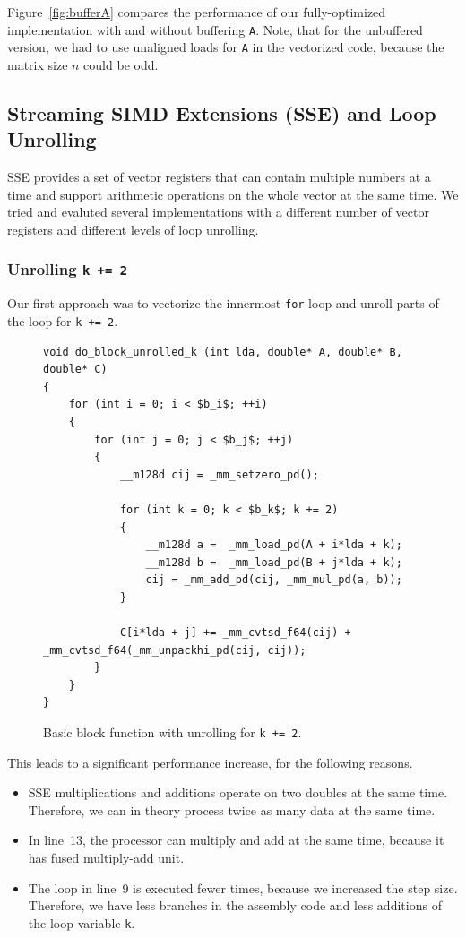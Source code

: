\documentclass[12pt]{article}
\begin{document}
Figure~\ref{fig:bufferA} compares the performance of our fully-optimized implementation with and without buffering \lstinline{A}. Note, that for the unbuffered version, we had to use unaligned loads for \lstinline{A} in the vectorized code, because the matrix size $n$ could be odd.

\subsection{Streaming SIMD Extensions (SSE) and Loop Unrolling}
SSE provides a set of vector registers that can contain multiple numbers at a time and support arithmetic operations on the whole vector at the same time. We tried and evaluted several implementations with a different number of vector registers and different levels of loop unrolling.

\subsubsection{Unrolling \lstinline{k += 2}}
Our first approach was to vectorize the innermost \lstinline{for} loop and unroll parts of the loop for \lstinline{k += 2}.

\begin{figure}[H]
\begin{lstlisting}[mathescape]
void do_block_unrolled_k (int lda, double* A, double* B, double* C)
{
	for (int i = 0; i < $b_i$; ++i)
	{
		for (int j = 0; j < $b_j$; ++j)
		{
			__m128d cij = _mm_setzero_pd();

			for (int k = 0; k < $b_k$; k += 2)
			{
				__m128d a =  _mm_load_pd(A + i*lda + k);
				__m128d b =  _mm_load_pd(B + j*lda + k);
				cij = _mm_add_pd(cij, _mm_mul_pd(a, b)); 
			}

			C[i*lda + j] += _mm_cvtsd_f64(cij) + _mm_cvtsd_f64(_mm_unpackhi_pd(cij, cij));
		}
	}
}
\end{lstlisting}
\caption{Basic block function with unrolling for \lstinline{k += 2}.}
\label{fig:basic_sse}
\end{figure}

This leads to a significant performance increase, for the following reasons.
\begin{itemize}
	\item SSE multiplications and additions operate on two doubles at the same time. Therefore, we can in theory process twice as many data at the same time.
	\item In line~13, the processor can multiply and add at the same time, because it has fused multiply-add unit.
	\item The loop in line~9 is executed fewer times, because we increased the step size. Therefore, we have less branches in the assembly code and less additions of the loop variable \lstinline{k}.
\end{itemize}
\end{document}
